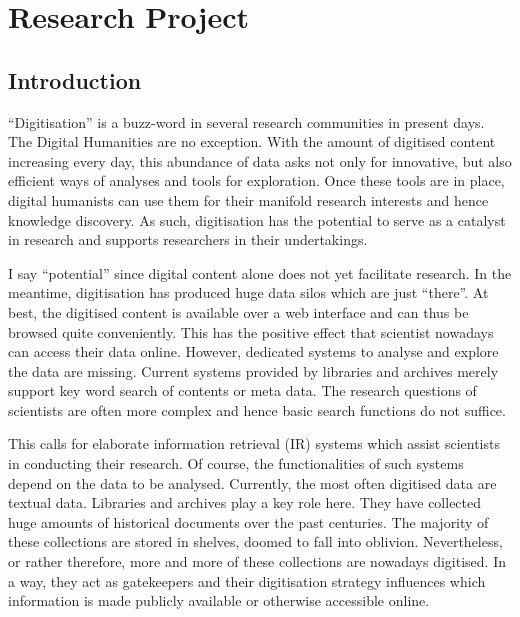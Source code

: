 \section{Research Project}
\subsection{Introduction}
``Digitisation'' is a buzz-word in several research communities in present days. The Digital Humanities are no exception. With the amount of digitised content increasing every day, this abundance of data asks not only for innovative, but also efficient ways of analyses and tools for exploration. Once these tools are in place, digital humanists can use them for their manifold research interests and hence knowledge discovery. As such, digitisation has the potential to serve as a catalyst in research and supports researchers in their undertakings.

I say ``potential'' since digital content alone does not yet facilitate research. In the meantime, digitisation has produced huge data silos which are just ``there''. At best, the digitised content is available over a web interface and can thus be browsed quite conveniently. This has the positive effect that scientist nowadays can access their data online. However, dedicated systems to analyse and explore the data are missing. Current systems provided by libraries and archives merely support key word search of contents or meta data. The research questions of scientists are often more complex and hence basic search functions do not suffice.

This calls for elaborate information retrieval (IR) systems which assist scientists in conducting their research. Of course, the functionalities of such systems depend on the data to be analysed. Currently, the most often digitised data are textual data. Libraries and archives play a key role here. They have collected huge amounts of historical documents over the past centuries. The majority of these collections are stored in shelves, doomed to fall into oblivion. Nevertheless, or rather therefore, more and more of these collections are nowadays digitised. In a way, they act as gatekeepers and their digitisation strategy influences which information is made publicly available or otherwise accessible online.  

